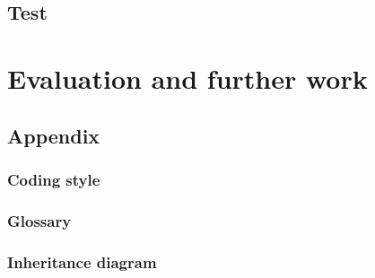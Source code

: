\documentclass[a4paper,11pt,fleqn,twoside,openright]{memoir} 	%
\begin{document}
\chapter{Test}
%

\part{Evaluation and further work}
%

\chapter{Appendix}


\section{Coding style}
%
\section{Glossary}
\label{glossary}
\section{Inheritance diagram}

\begingroup
\raggedright

\endgroup

\appendix
\clearforchapter

{}
\end{document}
